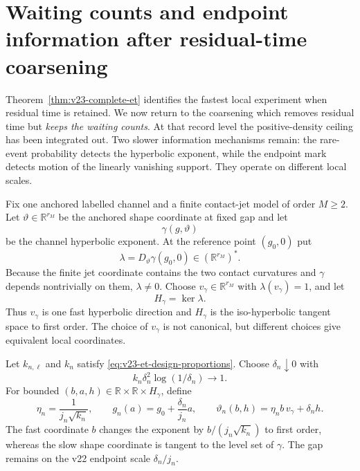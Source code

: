 \section{Waiting counts and endpoint information after residual-time coarsening}
\label{sec:v23-count-endpoint}

Theorem~\ref{thm:v23-complete-et} identifies the fastest local experiment
when residual time is retained.  We now return to the coarsening which removes
residual time but \emph{keeps the waiting counts}.  At that record level the
positive-density ceiling has been integrated out.  Two slower information
mechanisms remain: the rare-event probability detects the hyperbolic exponent,
while the endpoint mark detects motion of the linearly vanishing support.
They operate on different local scales.

Fix one anchored labelled channel and a finite contact-jet model of order
\(M\ge2\).  Let \(\vartheta\in\mathbb R^{r_M}\) be the anchored shape
coordinate at fixed gap and let
\[
                         \gamma(g,\vartheta)
\]
be the channel hyperbolic exponent.  At the reference point \((g_0,0)\) put
\[
 \lambda=D_\vartheta\gamma(g_0,0)\in(\mathbb R^{r_M})^*.
\]
Because the finite jet coordinate contains the two contact curvatures and
\(\gamma\) depends nontrivially on them, \(\lambda\ne0\).  Choose
\(v_\gamma\in\mathbb R^{r_M}\) with
\(\lambda(v_\gamma)=1\), and let
\[
                         H_\gamma=\ker\lambda.
\]
Thus \(v_\gamma\) is one fast hyperbolic direction and \(H_\gamma\) is the
iso-hyperbolic tangent space to first order.  The choice of
\(v_\gamma\) is not canonical, but different choices give equivalent local
coordinates.

Let \(k_{n,\ell}\) and \(k_n\) satisfy
\eqref{eq:v23-et-design-proportions}.  Choose \(\delta_n\downarrow0\) with
\begin{equation}\label{eq:v23-count-endpoint-critical}
             k_n\delta_n^2\log(1/\delta_n)\longrightarrow1.
\end{equation}
For bounded \((b,a,h)\in\mathbb R\times\mathbb R\times H_\gamma\), define
\begin{equation}\label{eq:v23-count-endpoint-parameter}
 \eta_n=\frac1{j_n\sqrt{k_n}},\qquad
 g_n(a)=g_0+\frac{\delta_n}{j_n}a,
 \qquad
 \vartheta_n(b,h)=\eta_nb\,v_\gamma+\delta_nh.
\end{equation}
The fast coordinate \(b\) changes the exponent by
\(b/(j_n\sqrt{k_n})\) to first order, whereas the slow shape coordinate is
tangent to the level set of \(\gamma\).  The gap remains on the v22 endpoint
scale \(\delta_n/j_n\).

